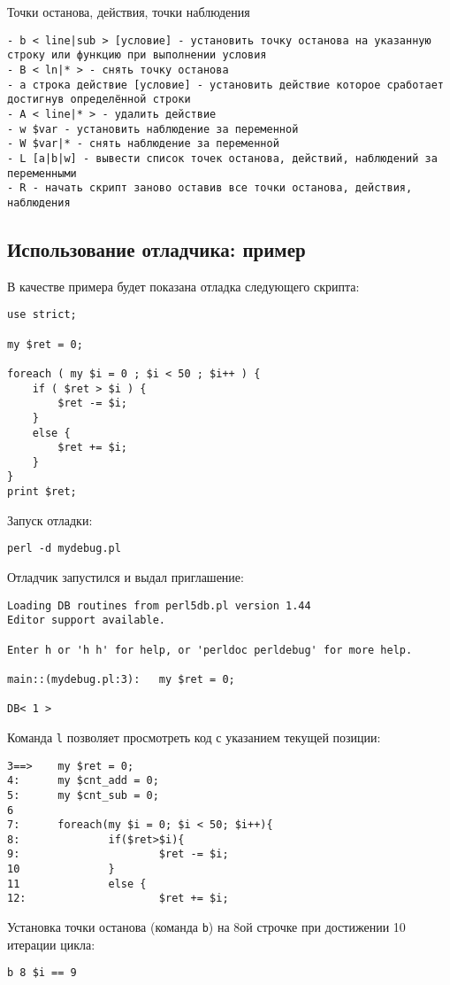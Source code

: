 Точки останова, действия, точки наблюдения
\begin{verbatim}
- b < line|sub > [условие] - установить точку останова на указанную строку или функцию при выполнении условия
- B < ln|* > - снять точку останова
- a строка действие [условие] - установить действие которое сработает достигнув определённой строки
- A < line|* > - удалить действие
- w $var - установить наблюдение за переменной
- W $var|* - снять наблюдение за переменной
- L [a|b|w] - вывести список точек останова, действий, наблюдений за переменными
- R - начать скрипт заново оставив все точки останова, действия, наблюдения
\end{verbatim}

\subsection{Использование отладчика: пример}
В качестве примера будет показана отладка следующего скрипта:
\begin{verbatim}
use strict;

my $ret = 0;

foreach ( my $i = 0 ; $i < 50 ; $i++ ) {
    if ( $ret > $i ) {
        $ret -= $i;
    }
    else {
        $ret += $i;
    }
}
print $ret;
\end{verbatim}
Запуск отладки:
\begin{verbatim}
perl -d mydebug.pl
\end{verbatim}
Отладчик запустился и выдал приглашение:
\begin{verbatim}
Loading DB routines from perl5db.pl version 1.44
Editor support available.

Enter h or 'h h' for help, or 'perldoc perldebug' for more help.

main::(mydebug.pl:3):   my $ret = 0;

DB< 1 >
\end{verbatim}
Команда \verb|l| позволяет просмотреть код с указанием текущей позиции:
\begin{verbatim}
3==>    my $ret = 0;
4:      my $cnt_add = 0;
5:      my $cnt_sub = 0;
6
7:      foreach(my $i = 0; $i < 50; $i++){
8:              if($ret>$i){
9:                      $ret -= $i;
10              }
11              else {
12:                     $ret += $i;
\end{verbatim}
Установка точки останова (команда \verb|b|) на 8ой строчке при достижении 10 итерации цикла:
\begin{verbatim}
b 8 $i == 9
\end{verbatim}
